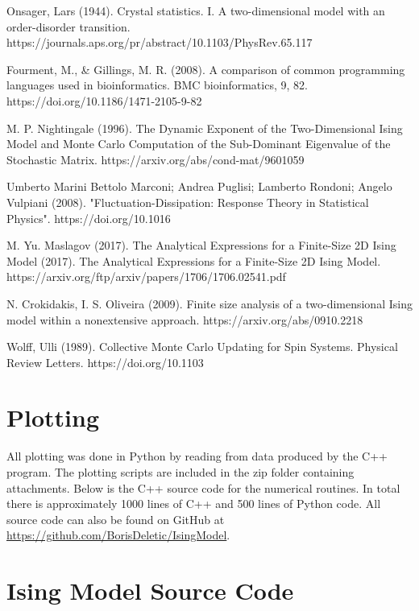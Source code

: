 \documentclass[a4paper, 12pt]{article}
\begin{document}
\newpage
\begin{thebibliography}{9}
Onsager, Lars (1944). Crystal statistics. I. A two-dimensional model with an order-disorder transition. https://journals.aps.org/pr/abstract/10.1103/PhysRev.65.117

Fourment, M., \& Gillings, M. R. (2008). A comparison of common programming languages used in bioinformatics. BMC bioinformatics, 9, 82. https://doi.org/10.1186/1471-2105-9-82

M. P. Nightingale (1996). The Dynamic Exponent of the Two-Dimensional Ising Model and Monte Carlo Computation of the Sub-Dominant Eigenvalue of the Stochastic Matrix. https://arxiv.org/abs/cond-mat/9601059

Umberto Marini Bettolo Marconi; Andrea Puglisi; Lamberto Rondoni; Angelo Vulpiani (2008). "Fluctuation-Dissipation: Response Theory in Statistical Physics". https://doi.org/10.1016%

M. Yu. Maslagov (2017). The Analytical Expressions for a Finite-Size 2D Ising Model (2017). The Analytical Expressions for a Finite-Size 2D Ising Model. https://arxiv.org/ftp/arxiv/papers/1706/1706.02541.pdf

N. Crokidakis, I. S. Oliveira (2009). Finite size analysis of a two-dimensional Ising model within a nonextensive approach. https://arxiv.org/abs/0910.2218

Wolff, Ulli (1989). Collective Monte Carlo Updating for Spin Systems. Physical Review Letters. https://doi.org/10.1103%
\end{thebibliography}


    \newpage

    \appendix
    
    \section{Plotting}
    All plotting was done in Python by reading from data produced by the C++ program. The plotting scripts are included in the zip folder containing attachments. Below is the C++ source code for the numerical routines. In total there is approximately 1000 lines of C++ and 500 lines of Python code. All source code can also be found on GitHub at \href{url}{https://github.com/BorisDeletic/IsingModel}.

    \section{Ising Model Source Code}
\end{document}
